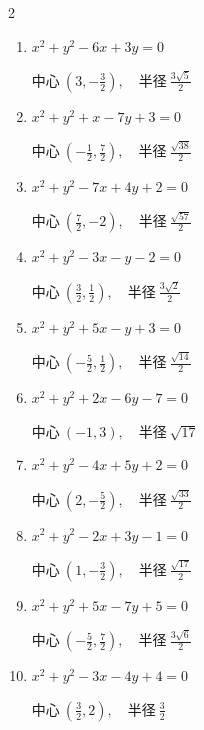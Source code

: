 \begin{multicols}{2}
\begin{enumerate}
        $\displaystyle 中心\: \left(-2,-\frac{3}{2}\right), \quad 半径 \ \frac{1}{2}$

  \item $x^{2}+y^{2}-6x+3y=0$

        $\displaystyle 中心\: \left(3,-\frac{3}{2}\right), \quad 半径 \ \frac{3\sqrt{5}}{2}$

  \item $x^{2}+y^{2}+x-7y+3=0$

        $\displaystyle 中心\: \left(-\frac{1}{2},\frac{7}{2}\right), \quad 半径 \ \frac{\sqrt{38}}{2}$

  \item $x^{2}+y^{2}-7x+4y+2=0$

        $\displaystyle 中心\: \left(\frac{7}{2},-2\right), \quad 半径 \ \frac{\sqrt{57}}{2}$

  \item $x^{2}+y^{2}-3x-y-2=0$

        $\displaystyle 中心\: \left(\frac{3}{2},\frac{1}{2}\right), \quad 半径 \ \frac{3\sqrt{2}}{2}$

  \item $x^{2}+y^{2}+5x-y+3=0$

        $\displaystyle 中心\: \left(-\frac{5}{2},\frac{1}{2}\right), \quad 半径 \ \frac{\sqrt{14}}{2}$

  \item $x^{2}+y^{2}+2x-6y-7=0$

        $\displaystyle 中心\: \left(-1,3\right), \quad 半径 \ \sqrt{17}$

  \item $x^{2}+y^{2}-4x+5y+2=0$

        $\displaystyle 中心\: \left(2,-\frac{5}{2}\right), \quad 半径 \ \frac{\sqrt{33}}{2}$

  \item $x^{2}+y^{2}-2x+3y-1=0$

        $\displaystyle 中心\: \left(1,-\frac{3}{2}\right), \quad 半径 \ \frac{\sqrt{17}}{2}$

  \item $x^{2}+y^{2}+5x-7y+5=0$

        $\displaystyle 中心\: \left(-\frac{5}{2},\frac{7}{2}\right), \quad 半径 \ \frac{3\sqrt{6}}{2}$

  \item $x^{2}+y^{2}-3x-4y+4=0$

        $\displaystyle 中心\: \left(\frac{3}{2},2\right), \quad 半径 \ \frac{3}{2}$


\end{enumerate}
\end{multicols}
